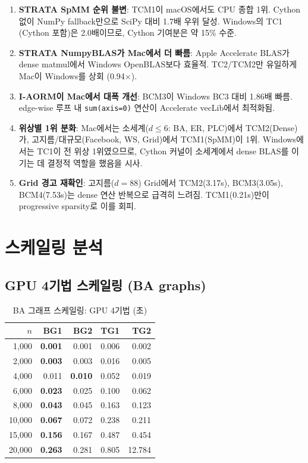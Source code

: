 \documentclass[11pt,a4paper]{article}
\begin{document}
\begin{keypoint}
\begin{enumerate}
\item \textbf{STRATA SpMM 순위 불변}: TCM1이 macOS에서도 CPU 종합 1위.
   Cython 없이 NumPy fallback만으로 SciPy 대비 1.7배 우위 달성.
   Windows의 TC1 (Cython 포함)은 2.0배이므로, Cython 기여분은 약 15\% 수준.
\item \textbf{STRATA NumpyBLAS가 Mac에서 더 빠름}:
   Apple Accelerate BLAS가 dense matmul에서 Windows OpenBLAS보다 효율적.
   TC2/TCM2만 유일하게 Mac이 Windows를 상회 (0.94$\times$).
\item \textbf{I-AORM이 Mac에서 대폭 개선}:
   BCM3이 Windows BC3 대비 1.86배 빠름.
   edge-wise 루프 내 \texttt{sum(axis=0)} 연산이 Accelerate vecLib에서 최적화됨.
\item \textbf{위상별 1위 분화}: Mac에서는 소세계($d \le 6$: BA, ER, PLC)에서
   TCM2(Dense)가, 고지름/대규모(Facebook, WS, Grid)에서 TCM1(SpMM)이 1위.
   Windows에서는 TC1이 전 위상 1위였으므로,
   Cython 커널이 소세계에서 dense BLAS를 이기는 데 결정적 역할을 했음을 시사.
\item \textbf{Grid 경고 재확인}: 고지름($d\!=\!88$) Grid에서
   TCM2(3.17s), BCM3(3.05s), BCM4(7.53s)는 dense 연산 반복으로 급격히 느려짐.
   TCM1(0.21s)만이 progressive sparsity로 이를 회피.
\end{enumerate}
\end{keypoint}


\section{스케일링 분석}

\subsection{GPU 4기법 스케일링 (BA graphs)}

\begin{table}[H]\centering
\caption{BA 그래프 스케일링: GPU 4기법 (초)}
\label{tab:scaling}
\small
\begin{tabular}{@{}rrrrr@{}}
\toprule
$n$ & \textbf{BG1} & \textbf{BG2} & \textbf{TG1} & \textbf{TG2} \\
\midrule
1,000 & \textbf{0.001} & 0.001 & 0.006 & 0.002 \\
2,000 & \textbf{0.003} & 0.003 & 0.016 & 0.005 \\
4,000 & 0.011 & \textbf{0.010} & 0.052 & 0.019 \\
6,000 & \textbf{0.023} & 0.025 & 0.100 & 0.062 \\
8,000 & \textbf{0.043} & 0.045 & 0.163 & 0.123 \\
10,000 & \textbf{0.067} & 0.072 & 0.238 & 0.211 \\
15,000 & \textbf{0.156} & 0.167 & 0.487 & 0.454 \\
\rowcolor{gridwarn!8} 20,000 & \textbf{0.263} & 0.281 & 0.805 & 12.784 \\
\bottomrule
\end{tabular}
\end{table}
\end{document}
